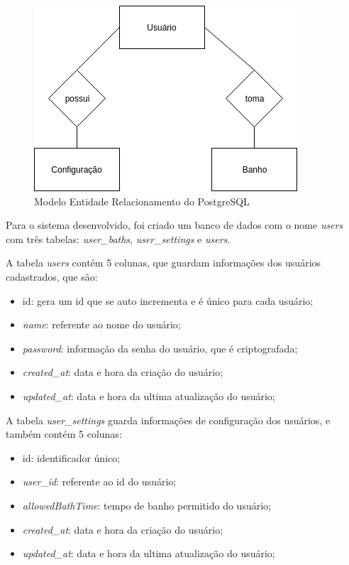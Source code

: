 \begin{figure}[htbp]
	\centering
	\includegraphics[width=0.6\linewidth]{figuras/ERPostgre.png}
	\caption{Modelo Entidade Relacionamento do PostgreSQL}
	\label{fig:erpostgre}
\end{figure}

Para o sistema desenvolvido, foi criado um banco de dados com o nome \textit{users} com três tabelas: \textit{user\_baths}, \textit{user\_settings} e \textit{users}.

A tabela \textit{users} contém 5 colunas, que guardam informações dos usuários cadastrados, que são:
\begin{itemize}
	\item id: gera um id que se auto incrementa e é único para cada usuário;
	\item \textit{name}: referente ao nome do usuário;
	\item \textit{password}: informação da senha do usuário, que é criptografada;
	\item \textit{created\_at}: data e hora da criação do usuário;
	\item \textit{updated\_at}: data e hora da ultima atualização do usuário;
\end{itemize}

A tabela \textit{user\_settings} guarda informações de configuração dos usuários, e também contém 5 colunas:

\begin{itemize}
	\item id: identificador único;
	\item \textit{user\_id}: referente ao id do usuário;
	\item \textit{allowedBathTime}: tempo de banho permitido do usuário;
	\item \textit{created\_at}: data e hora da criação do usuário;
	\item \textit{updated\_at}: data e hora da ultima atualização do usuário;
\end{itemize}

